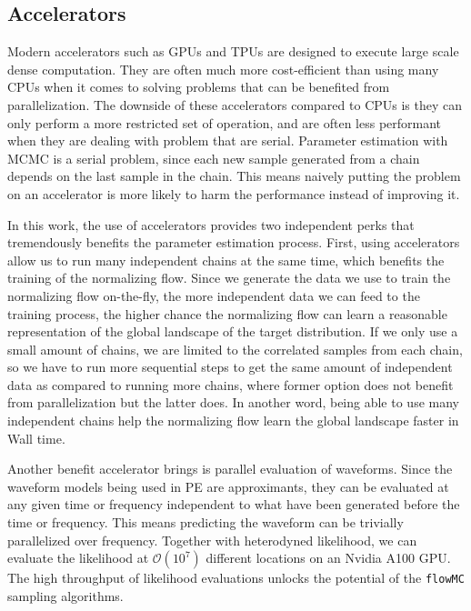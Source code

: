 \documentclass[twocolumn]{aastex631}
\begin{document}
\subsection{Accelerators}
\label{sec:accelerators}

Modern accelerators such as GPUs and TPUs are designed to execute large scale
dense computation. They are often much more cost-efficient than using many CPUs
when it comes to solving problems that can be benefited from parallelization.
The downside of these accelerators compared to CPUs is they can only perform a
more restricted set of operation, and are often less performant when they are
dealing with problem that are serial. Parameter estimation with MCMC is a serial
problem, since each new sample generated from a chain depends on the last sample
in the chain. This means naively putting the problem on an accelerator is more
likely to harm the performance instead of improving it.


In this work, the use of accelerators provides two independent perks that
tremendously benefits the parameter estimation process. First, using
accelerators allow us to run many independent chains at the same time, which
benefits the training of the normalizing flow. Since we generate the data we use
to train the normalizing flow on-the-fly, the more independent data we can feed
to the training process, the higher chance the normalizing flow can learn a
reasonable representation of the global landscape of the target distribution. If
we only use a small amount of chains, we are limited to the correlated samples
from each chain, so we have to run more sequential steps to get the same amount
of independent data as compared to running more chains, where former option does
not benefit from parallelization but the latter does. In another word, being
able to use many independent chains help the normalizing flow learn the global
landscape faster in Wall time.

Another benefit accelerator brings is parallel evaluation of waveforms. Since
the waveform models being used in PE are approximants, they can be evaluated at
any given time or frequency independent to what have been generated before the
time or frequency. This means predicting the waveform can be trivially
parallelized over frequency. Together with heterodyned likelihood, we can
evaluate the likelihood at $\mathcal{O}(10^7)$ different locations on an Nvidia
A100 GPU. The high throughput of likelihood evaluations unlocks the potential of
the \texttt{flowMC} sampling algorithms.
\end{document}
